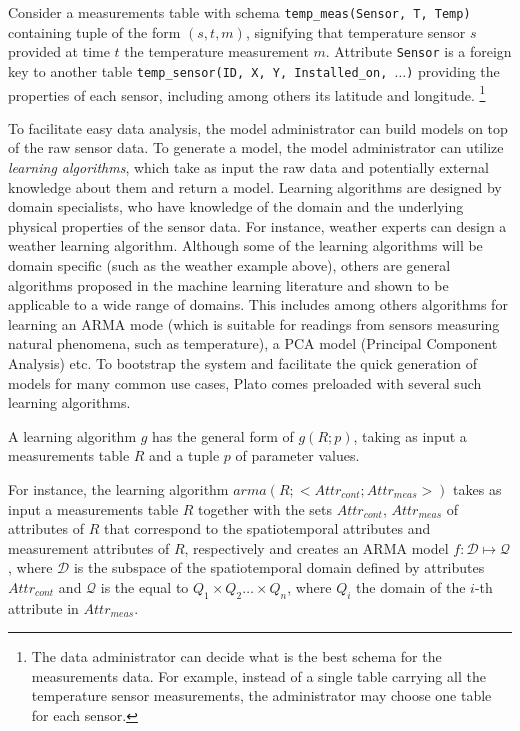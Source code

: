 \vspace*{0.5cm}
\begin{example}
Consider a measurements table with schema \texttt{temp\_meas(Sensor, T, Temp)} containing tuple of the form $(s, t, m)$, signifying that temperature sensor $s$ provided at time $t$ the temperature measurement $m$.
Attribute \texttt{Sensor} is a foreign key to another table \texttt{temp\_sensor(ID, X, Y, Installed\_on, $\ldots$)} providing the properties of each sensor, including among others its latitude and longitude.%
\footnote{The data administrator can decide what is the best schema for the measurements data. For example, instead of a single table carrying all the temperature sensor measurements, the administrator may choose one table for each sensor.
}
\end{example}
\vspace*{0.5cm}

To facilitate easy data analysis, the model administrator can build models on top of the raw sensor data. To generate a model, the model administrator can utilize {\em learning algorithms}, which take as input the raw data and potentially external knowledge about them and return a model. Learning algorithms are designed by domain specialists, who have knowledge of the domain and the underlying physical properties of the sensor data. For instance, weather experts can design a weather learning algorithm. Although some of the learning algorithms will be domain specific (such as the weather example above), others are general algorithms proposed in the machine learning literature  and shown to be applicable to a wide range of domains. This includes among others algorithms for learning an ARMA mode (which is suitable for readings from sensors measuring natural phenomena, such as temperature), a PCA model (Principal Component Analysis) etc. To bootstrap the system and facilitate the quick generation of models for many common use cases, Plato comes preloaded with several such learning algorithms.

A learning algorithm $g$ has the general form of $g(R;p)$, taking as input a measurements table $R$ and a tuple $p$ of parameter values.

\vspace*{0.5cm}
\begin{example}
For instance, the learning algorithm $arma(R;<Attr_{cont}; Attr_{meas}>)$ takes as input a measurements table $R$ together with the sets $Attr_{cont}$, $Attr_{meas}$ of attributes of $R$ that correspond to the spatiotemporal attributes and measurement attributes of $R$, respectively and creates an ARMA model $f:\mathcal{D}\mapsto\mathcal{Q}$, where $\mathcal{D}$ is the subspace of the spatiotemporal domain defined by attributes $Attr_{cont}$ and $\mathcal{Q}$ is the equal to $Q_1 \times Q_2 \ldots \times Q_n$, where $Q_i$ the domain of the $i$-th attribute in $Attr_{meas}$. 
\end{example}  
\vspace*{0.5cm}


